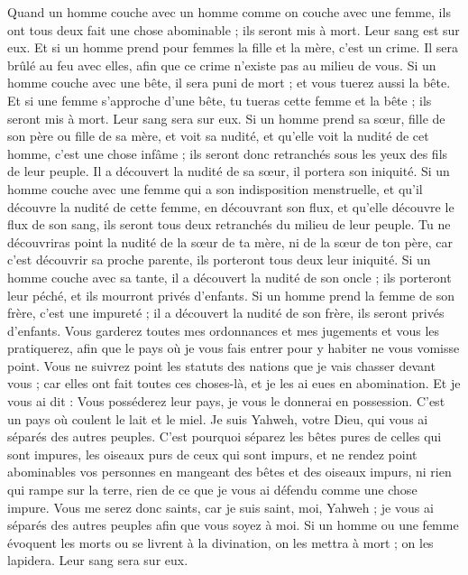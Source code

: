 \begin{multicols}{2}
Quand un homme couche avec un homme comme on couche avec une femme, ils ont tous deux fait une chose abominable ; ils seront mis à mort. Leur sang est sur eux.
Et si un homme prend pour femmes la fille et la mère, c'est un crime. Il sera brûlé au feu avec elles, afin que ce crime n'existe pas au milieu de vous.
Si un homme couche avec une bête, il sera puni de mort ; et vous tuerez aussi la bête.
Et si une femme s'approche d'une bête, tu tueras cette femme et la bête ; ils seront mis à mort. Leur sang sera sur eux.
Si un homme prend sa sœur, fille de son père ou fille de sa mère, et voit sa nudité, et qu'elle voit la nudité de cet homme, c'est une chose infâme ; ils seront donc retranchés sous les yeux des fils de leur peuple. Il a découvert la nudité de sa sœur, il portera son iniquité.
Si un homme couche avec une femme qui a son indisposition menstruelle, et qu'il découvre la nudité de cette femme, en découvrant son flux, et qu'elle découvre le flux de son sang, ils seront tous deux retranchés du milieu de leur peuple.
Tu ne découvriras point la nudité de la sœur de ta mère, ni de la sœur de ton père, car c'est découvrir sa proche parente, ils porteront tous deux leur iniquité.
Si un homme couche avec sa tante, il a découvert la nudité de son oncle ; ils porteront leur péché, et ils mourront privés d'enfants.
Si un homme prend la femme de son frère, c'est une impureté ; il a découvert la nudité de son frère, ils seront privés d'enfants.
Vous garderez toutes mes ordonnances et mes jugements et vous les pratiquerez, afin que le pays où je vous fais entrer pour y habiter ne vous vomisse point.
Vous ne suivrez point les statuts des nations que je vais chasser devant vous ; car elles ont fait toutes ces choses-là, et je les ai eues en abomination.
Et je vous ai dit : Vous posséderez leur pays, je vous le donnerai en possession. C'est un pays où coulent le lait et le miel. Je suis Yahweh, votre Dieu, qui vous ai séparés des autres peuples.
C'est pourquoi séparez les bêtes pures de celles qui sont impures, les oiseaux purs de ceux qui sont impurs, et ne rendez point abominables vos personnes en mangeant des bêtes et des oiseaux impurs, ni rien qui rampe sur la terre, rien de ce que je vous ai défendu comme une chose impure.
Vous me serez donc saints, car je suis saint, moi, Yahweh ; je vous ai séparés des autres peuples afin que vous soyez à moi.
Si un homme ou une femme évoquent les morts ou se livrent à la divination, on les mettra à mort ; on les lapidera. Leur sang sera sur eux.

\end{multicols}
